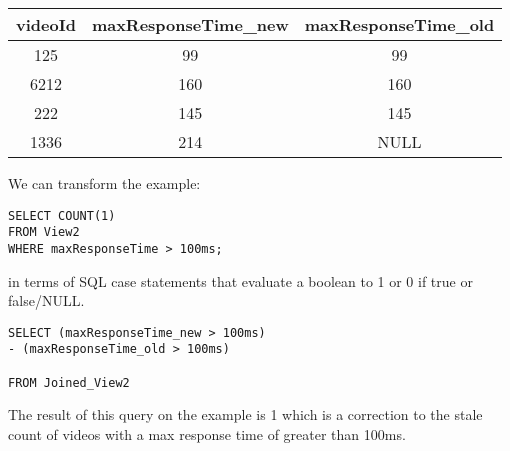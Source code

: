 \begin{tabular}{|c|c|c|}
\hline 
videoId & maxResponseTime\_new & maxResponseTime\_old \tabularnewline
\hline 
\hline 
125 & 99 & 99\tabularnewline
\hline 
6212 & 160 & 160\tabularnewline
\hline 
222 & 145 & 145\tabularnewline
\hline 
1336 & 214 & NULL\tabularnewline
\hline 
\end{tabular}

We can transform the example:

\begin{lstlisting}
SELECT COUNT(1) 
FROM View2 
WHERE maxResponseTime > 100ms;
\end{lstlisting}

in terms of SQL case statements that evaluate a boolean to 1 or 0 if true or false/NULL.
\begin{lstlisting}
SELECT (maxResponseTime_new > 100ms) 
- (maxResponseTime_old > 100ms)

FROM Joined_View2 
\end{lstlisting}
The result of this query on the example is 1 which is a correction to the stale count 
of videos with a max response time of greater than 100ms.
